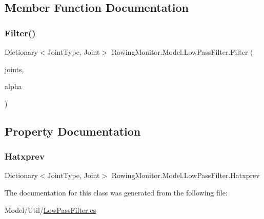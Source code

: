 \subsection{Member Function Documentation}
\mbox{\label{class_rowing_monitor_1_1_model_1_1_low_pass_filter_abd95054e31280d78ad6d0d4a5bd106ea}} 
\subsubsection{\texorpdfstring{Filter()}{Filter()}}
{\footnotesize\ttfamily Dictionary$<$Joint\+Type, Joint$>$ Rowing\+Monitor.\+Model.\+Low\+Pass\+Filter.\+Filter (\begin{DoxyParamCaption}\item[{Dictionary$<$ Joint\+Type, Joint $>$}]{joints,  }\item[{Dictionary$<$ Joint\+Type, Dictionary$<$ String, Double $>$$>$}]{alpha }\end{DoxyParamCaption})}



\subsection{Property Documentation}
\mbox{\label{class_rowing_monitor_1_1_model_1_1_low_pass_filter_ab5c930d79699ed13c290b56a9d4501c6}} 
\subsubsection{\texorpdfstring{Hatxprev}{Hatxprev}}
{\footnotesize\ttfamily Dictionary$<$Joint\+Type, Joint$>$ Rowing\+Monitor.\+Model.\+Low\+Pass\+Filter.\+Hatxprev\hspace{0.3cm}{\ttfamily [get]}}



The documentation for this class was generated from the following file\+:\begin{DoxyCompactItemize}
\item 
Model/\+Util/\hyperlink{_low_pass_filter_8cs}{Low\+Pass\+Filter.\+cs}\end{DoxyCompactItemize}
